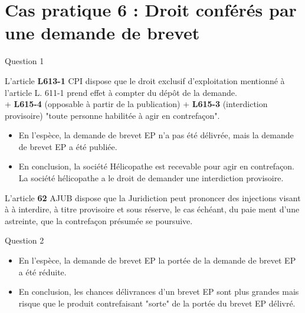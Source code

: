 
\section[Cas 6]{Cas pratique 6 : Droit conférés par une demande de brevet}

\begin{frame}{Question 1}

\begin{block}{}
L'article \textbf{L613-1} CPI dispose que le droit exclusif d'exploitation mentionné 
à l'article L. 611-1 prend effet à compter du dépôt de la demande.\\
+ \textbf{L615-4} (opposable à partir de la publication)
+ \textbf{L615-3} (interdiction provisoire) "toute personne habilitée
à agir en contrefaçon".
\end{block}

\begin{itemize}
  \item En l'espèce, la demande de brevet EP n'a pas été délivrée, mais
  la demande de brevet EP a été publiée.
  \item En conclusion, la société Hélicopathe est recevable pour agir
  en contrefaçon. La société hélicopathe a le droit de demander
  une interdiction provisoire.
\end{itemize}

\begin{block}{}
L'article \textbf{62} AJUB dispose que la Juridiction peut
prononcer des injections visant à 
à interdire, à titre provisoire et
sous réserve, le cas échéant, du paie
ment d'une astreinte, que la contrefaçon
présumée se poursuive.
\end{block}

\end{frame}

\begin{frame}{Question 2}

\begin{itemize}
  \item En l'espèce, la demande de brevet EP
  la portée de la demande de brevet EP a été réduite.
  \item En conclusion, les chances délivrances d'un
  brevet EP sont plus grandes mais risque que le produit
  contrefaisant "sorte" de la portée du brevet EP délivré.
\end{itemize}

\end{frame}


